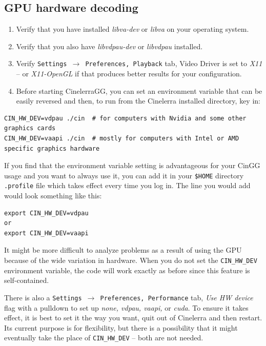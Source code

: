 \subsection{GPU hardware decoding}%
\label{sub:gpu_hardware_decoding}

\begin{enumerate}
	\item Verify that you have installed \textit{libva-dev} or \textit{libva} on your operating system.
	\item Verify that you also have \textit{libvdpau-dev} or \textit{libvdpau} installed.
	\item Verify \texttt{Settings $\rightarrow$ Preferences, Playback} tab, Video Driver is set to\textit{ X11} -- or \textit{X11-OpenGL} if that	produces better results for your configuration.
	\item Before starting CinelerraGG, you can set an environment variable that can be easily reversed and
	then, to run from the Cinelerra installed directory, key in:
\end{enumerate}

\begin{lstlisting}[numbers=none]
CIN_HW_DEV=vdpau ./cin	# for computers with Nvidia and some other graphics cards
CIN_HW_DEV=vaapi ./cin	# mostly for computers with Intel or AMD specific graphics hardware
\end{lstlisting}

If you find that the environment variable setting is advantageous for your CinGG usage and you want to always use it, you can add it in your \texttt{\$HOME} directory \texttt{.profile} file which takes effect every time you log in.  The line you would add would look something like this:

\begin{lstlisting}[numbers=none]
export CIN_HW_DEV=vdpau
or
export CIN_HW_DEV=vaapi
\end{lstlisting}

It might be more difficult to analyze problems as a result of using the GPU because of the wide variation in hardware.  When you do not set the \texttt{CIN\_HW\_DEV} environment variable, the code will work exactly as before since this feature is self-contained.

There is also a \texttt{Settings $\rightarrow$ Preferences, Performance} tab, \textit{Use HW device} flag
with a pulldown to set up \textit{none, vdpau, vaapi,} or \textit{cuda}.  To ensure it takes effect, it is best to set it the way you want, quit out of Cinelerra and then restart.  Its current purpose is for flexibility, but there is a possibility that it might eventually take the place of \texttt{CIN\_HW\_DEV} -- both are not needed.

